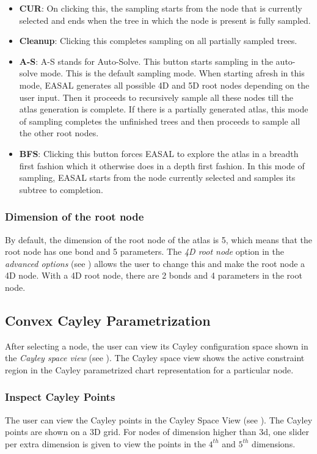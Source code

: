 \documentclass[10pt]{article}
\begin{document}
\begin{itemize}
\item \textbf{CUR}: On clicking this, the sampling starts from the node that is
		currently selected and ends when the tree in which the node is present
		is fully sampled.
\item \textbf{Cleanup}: Clicking this completes sampling on all partially
		sampled trees.
\item \textbf{A-S}: A-S stands for Auto-Solve. This button starts sampling in
		the auto-solve mode. This is the default sampling mode. When starting
		afresh in this mode, EASAL generates all possible 4D and 5D root nodes
		depending on the user input. Then it proceeds to recursively sample all
		these nodes till the atlas generation is complete. If there is a
		partially generated atlas, this mode of sampling completes	 the
		unfinished trees and then proceeds to sample all the other root nodes.
\item \textbf{BFS}: Clicking this button forces EASAL to explore the atlas in
		a breadth first fashion which it otherwise does in a depth first
		fashion. In this mode of sampling, EASAL starts from the
		node currently selected and samples its subtree to completion.

\end{itemize}

\subsubsection{Dimension of the root node}
By default, the dimension of the root node of the atlas is 5, which means that
the root node has one bond and 5 parameters. The \emph{4D root node} option in the
\emph{advanced options} (see ) allows the user to change
this and make the root node a 4D node. With a 4D root node, there are 2 bonds
and 4 parameters in the root node.

\subsection{Convex Cayley Parametrization}
After selecting a node, the user can view its Cayley configuration space shown
in the \emph{Cayley space view} (see ). The Cayley space
view shows the active constraint region in the Cayley parametrized chart
representation for a particular node.

\subsubsection{Inspect Cayley Points}
The user can view the Cayley points in the Cayley Space View (see
). The Cayley points are shown on a 3D grid. For nodes
of dimension higher than 3d, one slider per extra dimension is given to view
the points in the $4^{th}$ and $5^{th}$ dimensions.
\end{document}
